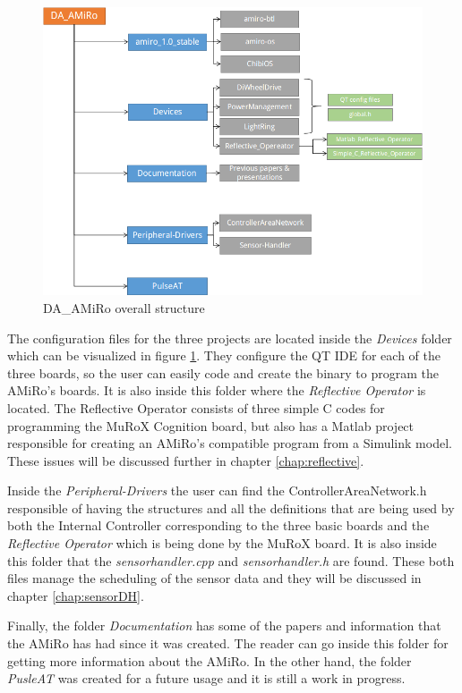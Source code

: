 \documentclass[12pt]{report}%
\begin{document}
\begin{figure}[ht]
	\centering
	\includegraphics[width=\textwidth]{DAAMIRO}
    \caption{DA\_AMiRo overall structure}
    \label{fig:DAAMIROstr}
\end{figure}

The configuration files for the three projects are located inside the \textit{Devices} folder which can be visualized in figure \ref{fig:DAAMIROstr}. They configure the QT IDE for each of the three boards, so the user can easily code and create the binary to program the AMiRo's boards. It is also inside this folder where the \textit{Reflective Operator} is located. The Reflective Operator consists of three simple C codes for programming the MuRoX Cognition board, but also has a Matlab project responsible for creating an AMiRo's compatible program from a Simulink model. These issues will be discussed further in chapter \ref{chap:reflective}.

Inside the \textit{Peripheral-Drivers} the user can find the ControllerAreaNetwork.h responsible of having the structures and all the definitions that are being used by both the Internal Controller corresponding to the three basic boards and the \textit{Reflective Operator} which is being done by the MuRoX board. It is also inside this folder that the \textit{sensorhandler.cpp} and \textit{sensorhandler.h} are found. These both files manage the scheduling of the sensor data and they will be discussed in chapter \ref{chap:sensorDH}.

Finally, the folder \textit{Documentation} has some of the papers and information that the AMiRo has had since it was created. The reader can go inside this folder for getting more information about the AMiRo. In the other hand, the folder \textit{PusleAT} was created for a future usage and it is still a work in progress.
\end{document}
